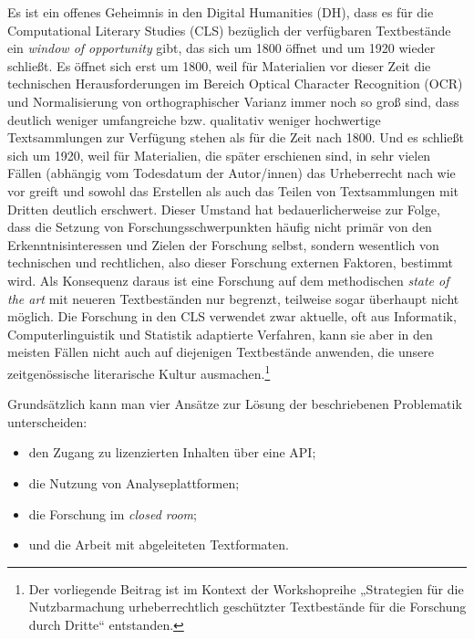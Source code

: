 Es ist ein offenes Geheimnis in den Digital Humanities (DH), dass es für die Computational Literary Studies (CLS) bezüglich der verfügbaren Textbestände ein \textit{window of opportunity} gibt, das sich um 1800 öffnet und um 1920 wieder schließt. Es öffnet sich erst um 1800, weil für Materialien vor dieser Zeit die technischen Herausforderungen im Bereich Optical Character Recognition (OCR) und Normalisierung von orthographischer Varianz immer noch so groß sind, dass deutlich weniger umfangreiche bzw. qualitativ weniger hochwertige Textsammlungen zur Verfügung stehen als für die Zeit nach 1800. Und es schließt sich um 1920, weil für Materialien, die später erschienen sind, in sehr vielen Fällen (abhängig vom Todesdatum der Autor/innen) das Urheberrecht nach wie vor greift und sowohl das Erstellen als auch das Teilen von Textsammlungen mit Dritten deutlich erschwert. Dieser Umstand hat bedauerlicherweise zur Folge, dass die Setzung von Forschungsschwerpunkten häufig nicht primär von den Erkenntnisinteressen und Zielen der Forschung selbst, sondern wesentlich von technischen und rechtlichen, also dieser Forschung externen Faktoren, bestimmt wird. Als Konsequenz daraus ist eine Forschung auf dem methodischen \textit{state of the art} mit neueren Textbeständen nur begrenzt, teilweise sogar überhaupt nicht möglich. Die Forschung in den CLS verwendet zwar aktuelle, oft aus Informatik, Computerlinguistik und Statistik adaptierte Verfahren, kann sie aber in den meisten Fällen nicht auch auf diejenigen Textbestände anwenden, die unsere zeitgenössische literarische Kultur ausmachen.\footnote{Der vorliegende Beitrag ist im Kontext der Workshopreihe „Strategien für die Nutzbarmachung urheberrechtlich geschützter Textbestände für die Forschung durch Dritte“ entstanden.}

Grundsätzlich kann man vier Ansätze zur Lösung der beschriebenen Problematik unterscheiden: 
\begin{itemize}
\item den Zugang zu lizenzierten Inhalten über eine API;
\item die Nutzung von Analyseplattformen; 
\item die Forschung im \textit{closed room};
\item und die Arbeit mit abgeleiteten Textformaten.
\end{itemize} 

\printbibliography

